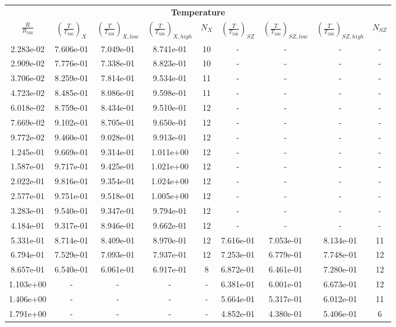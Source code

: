 \documentclass[traditabstract   ]{aa} %
\begin{document}
\begin{appendix}
\begin{table}
\begin{center}


\begin{tabular}{ c c c c c c c c c }
\multicolumn{9}{c}{\bf Temperature} \\
$\frac{R}{R_{500}}$ & $\left( \frac{T}{T_{500}} \right)_{X}$ & $\left( \frac{T}{T_{500}} \right)_{X,low}$ & $\left( \frac{T}{T_{500}} \right)_{X,high}$ & $N_{X}$ & $\left( \frac{T}{T_{500}} \right)_{SZ}$ & $\left( \frac{T}{T_{500}} \right)_{SZ,low}$ & $\left( \frac{T}{T_{500}} \right)_{SZ,high}$ & $N_{SZ}$ \\
\hline
2.283e-02 & 7.606e-01 & 7.049e-01 & 8.741e-01 & 10 & - & - & - & - \\
2.909e-02 & 7.776e-01 & 7.338e-01 & 8.823e-01 & 10 & - & - & - & - \\
3.706e-02 & 8.259e-01 & 7.814e-01 & 9.534e-01 & 11 & - & - & - & - \\
4.723e-02 & 8.485e-01 & 8.086e-01 & 9.598e-01 & 11 & - & - & - & - \\
6.018e-02 & 8.759e-01 & 8.434e-01 & 9.510e-01 & 12 & - & - & - & - \\
7.669e-02 & 9.102e-01 & 8.705e-01 & 9.650e-01 & 12 & - & - & - & - \\
9.772e-02 & 9.460e-01 & 9.028e-01 & 9.913e-01 & 12 & - & - & - & - \\
1.245e-01 & 9.669e-01 & 9.314e-01 & 1.011e+00 & 12 & - & - & - & - \\
1.587e-01 & 9.717e-01 & 9.425e-01 & 1.021e+00 & 12 & - & - & - & - \\
2.022e-01 & 9.816e-01 & 9.354e-01 & 1.024e+00 & 12 & - & - & - & - \\
2.577e-01 & 9.751e-01 & 9.518e-01 & 1.005e+00 & 12 & - & - & - & - \\
3.283e-01 & 9.540e-01 & 9.347e-01 & 9.794e-01 & 12 & - & - & - & - \\
4.184e-01 & 9.317e-01 & 8.946e-01 & 9.662e-01 & 12 & - & - & - & - \\
5.331e-01 & 8.714e-01 & 8.409e-01 & 8.970e-01 & 12 & 7.616e-01 & 7.053e-01 & 8.134e-01 & 11 \\
6.794e-01 & 7.529e-01 & 7.093e-01 & 7.937e-01 & 12 & 7.253e-01 & 6.779e-01 & 7.748e-01 & 12 \\
8.657e-01 & 6.540e-01 & 6.061e-01 & 6.917e-01 & 8 & 6.872e-01 & 6.461e-01 & 7.280e-01 & 12 \\
1.103e+00 & - & - & - & - & 6.381e-01 & 6.001e-01 & 6.673e-01 & 12 \\
1.406e+00 & - & - & - & - & 5.664e-01 & 5.317e-01 & 6.012e-01 & 11 \\
1.791e+00 & - & - & - & - & 4.852e-01 & 4.380e-01 & 5.406e-01 & 6 \\
\hline
\hline
\end{tabular}


\end{center}
\end{table}
\end{appendix}
\end{document}
